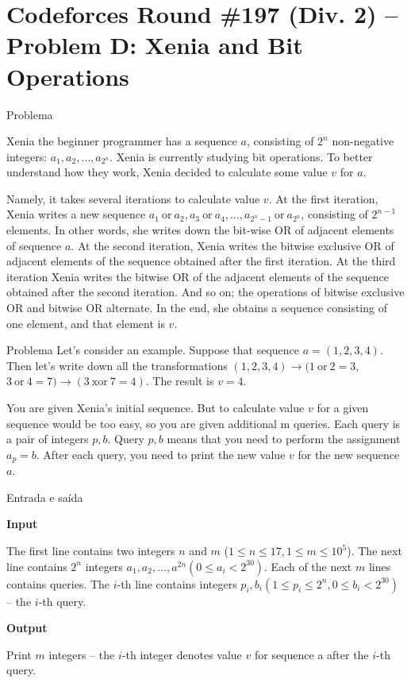 \section{Codeforces Round \#197 (Div. 2) -- Problem D: Xenia and Bit Operations}

\begin{frame}[fragile]{Problema}

Xenia the beginner programmer has a sequence $a$, consisting of $2^n$ non-negative integers: 
$a_1, a_2, \ldots, a_{2^n}$. Xenia is currently studying bit operations. To better understand how 
they work, Xenia decided to calculate some value $v$ for $a$.

Namely, it takes several iterations to calculate value $v$. At the first iteration, Xenia writes 
a new sequence $a_1\ \mbox{or}\ a_2, a_3\ \mbox{or}\ a_4, \ldots, a_{2^n - 1}\ \mbox{or}\ a_{2^n}$, consisting of $2^{n - 1}$
elements. In other words, she writes down the bit-wise OR of adjacent elements of sequence $a$. At 
the second iteration, Xenia writes the bitwise exclusive OR of adjacent elements of the sequence 
obtained after the first iteration. At the third iteration Xenia writes the bitwise OR of the 
adjacent elements of the sequence obtained after the second iteration. And so on; the operations 
of bitwise exclusive OR and bitwise OR alternate. In the end, she obtains a sequence consisting of 
one element, and that element is $v$.
\end{frame}

\begin{frame}[fragile]{Problema}
Let's consider an example. Suppose that sequence $a = (1, 2, 3, 4)$. Then let's write down all the 
transformations $(1, 2, 3, 4) \to (1\ \mbox{or}\ 2 = 3,$ $3\ \mbox{or}\ 4 = 7) \to (3\ \mbox{xor}\ 
7 = 4)$. The result is $v = 4$.

You are given Xenia's initial sequence. But to calculate value $v$ for a given sequence would be 
too easy, so you are given additional m queries. Each query is a pair of integers $p, b$. Query 
$p, b$ means that you need to perform the assignment $a_p = b$. After each query, you need to 
print the new value $v$ for the new sequence $a$.
\end{frame}


\begin{frame}[fragile]{Entrada e saída}

\textbf{Input}

The first line contains two integers $n$ and $m$ ($1\leq n\leq 17, 1\leq m\leq 10^5$). The next 
line contains $2^n$ integers $a_1, a_2, \ldots, a^{2n} (0\leq a_i < 2^{30})$. Each of the next 
$m$ lines contains queries. The $i$-th line contains integers $p_i, b_i (1\leq p_i\leq 2^n, 0 \leq 
b_i < 2^{30})$ -- the $i$-th query.

\textbf{Output}

Print $m$ integers -- the $i$-th integer denotes value $v$ for sequence a after the $i$-th query.

\end{frame}

